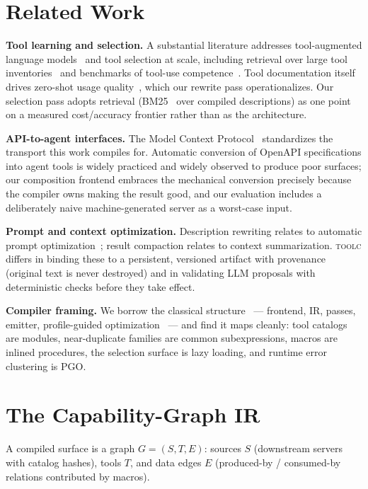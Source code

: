 \documentclass[11pt]{article}
\begin{document}
\section{Related Work}

\textbf{Tool learning and selection.} A substantial literature addresses
tool-augmented language models~\cite{schick2023toolformer,yao2023react} and
tool selection at scale, including retrieval over large tool
inventories~\cite{qin2023toolllm,patil2023gorilla} and benchmarks of
tool-use competence~\cite{li2023apibank}. Tool documentation itself drives
zero-shot usage quality~\cite{hsieh2023tooldoc}, which our rewrite pass
operationalizes. Our selection pass adopts retrieval
(BM25~\cite{robertson2009bm25} over compiled descriptions) as one point on a
measured cost/accuracy frontier rather than as the architecture.

\textbf{API-to-agent interfaces.} The Model Context Protocol~\cite{mcp2024}
standardizes the transport this work compiles for. Automatic conversion of OpenAPI
specifications into agent tools is widely practiced and widely observed to
produce poor surfaces; our composition frontend embraces the mechanical
conversion precisely because the compiler owns making the result good, and
our evaluation includes a deliberately naive machine-generated server as a
worst-case input.

\textbf{Prompt and context optimization.} Description rewriting relates to
automatic prompt optimization~\cite{zhou2023ape}; result compaction relates
to context summarization. \textsc{toolc} differs in binding these to a persistent,
versioned artifact with provenance (original text is never destroyed) and in
validating LLM proposals with deterministic checks before they take effect.

\textbf{Compiler framing.} We borrow the classical structure~\cite{aho2006compilers} --- frontend,
IR, passes, emitter, profile-guided optimization~\cite{pettis1990pgo} --- and
find it maps cleanly:
tool catalogs are modules, near-duplicate families are common subexpressions,
macros are inlined procedures, the selection surface is lazy loading, and
runtime error clustering is PGO.

\section{The Capability-Graph IR}\label{sec:ir}

A compiled surface is a graph $G = (S, T, E)$: sources $S$ (downstream
servers with catalog hashes), tools $T$, and data edges $E$ (produced-by /
consumed-by relations contributed by macros).
\end{document}
